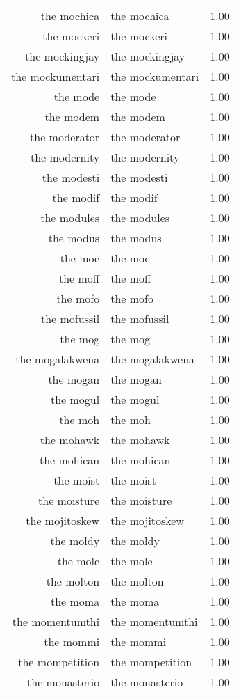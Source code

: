 \begin{table}[ht]
\begin{tabular}{rlr}
  the mochica & the mochica & 1.00 \\ 
  the mockeri & the mockeri & 1.00 \\ 
  the mockingjay & the mockingjay & 1.00 \\ 
  the mockumentari & the mockumentari & 1.00 \\ 
  the mode & the mode & 1.00 \\ 
  the modem & the modem & 1.00 \\ 
  the moderator & the moderator & 1.00 \\ 
  the modernity & the modernity & 1.00 \\ 
  the modesti & the modesti & 1.00 \\ 
  the modif & the modif & 1.00 \\ 
  the modules & the modules & 1.00 \\ 
  the modus & the modus & 1.00 \\ 
  the moe & the moe & 1.00 \\ 
  the moff & the moff & 1.00 \\ 
  the mofo & the mofo & 1.00 \\ 
  the mofussil & the mofussil & 1.00 \\ 
  the mog & the mog & 1.00 \\ 
  the mogalakwena & the mogalakwena & 1.00 \\ 
  the mogan & the mogan & 1.00 \\ 
  the mogul & the mogul & 1.00 \\ 
  the moh & the moh & 1.00 \\ 
  the mohawk & the mohawk & 1.00 \\ 
  the mohican & the mohican & 1.00 \\ 
  the moist & the moist & 1.00 \\ 
  the moisture & the moisture & 1.00 \\ 
  the mojitoskew & the mojitoskew & 1.00 \\ 
  the moldy & the moldy & 1.00 \\ 
  the mole & the mole & 1.00 \\ 
  the molton & the molton & 1.00 \\ 
  the moma & the moma & 1.00 \\ 
  the momentumthi & the momentumthi & 1.00 \\ 
  the mommi & the mommi & 1.00 \\ 
  the mompetition & the mompetition & 1.00 \\ 
  the monasterio & the monasterio & 1.00 \\ 

\end{tabular}
\end{table}
